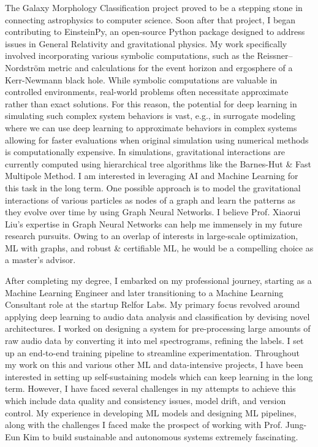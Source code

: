 \documentclass{article}
\begin{document}
  \vspace{5pt}
\hspace{0.25in}The Galaxy Morphology Classification project proved to be a stepping stone in
connecting astrophysics to computer science. Soon after that project, I began
contributing to EinsteinPy, an open-source Python package designed to address
issues in General Relativity and gravitational physics. My work specifically
involved incorporating various symbolic computations, such as the
Reissner–Nordström metric and calculations for the event horizon and ergosphere
of a Kerr-Newmann black hole. While symbolic computations are valuable in
controlled environments, real-world problems often necessitate approximate
rather than exact solutions. For this reason, the potential for deep learning in
simulating such complex system behaviors is vast, e.g., in surrogate modeling
where we can use deep learning to approximate behaviors in complex systems
allowing for faster evaluations when original simulation using numerical methods
is computationally expensive. In simulations, gravitational interactions are
currently computed using hierarchical tree algorithms like the Barnes-Hut \& Fast
Multipole Method. I am interested in leveraging AI and Machine Learning for this
task in the long term. One possible approach is to model the gravitational
interactions of various particles as nodes of a graph and learn the patterns as
they evolve over time by using Graph Neural Networks. I believe Prof. Xiaorui
Liu’s expertise in Graph Neural Networks can help me immensely in my future
research pursuits. Owing to an overlap of interests in large-scale optimization,
ML with graphs, and robust \& certifiable ML, he would be a compelling choice as a master’s advisor.

  \vspace{5pt}
\hspace{0.25in}After completing my degree, I embarked on my professional journey, starting as a
Machine Learning Engineer and later transitioning to a Machine Learning
Consultant role at the startup Relfor Labs. My primary focus revolved around
applying deep learning to audio data analysis and classification by devising
novel architectures. I worked on designing a system for pre-processing large
amounts of raw audio data by converting it into mel spectrograms, refining the
labels. I set up an end-to-end training pipeline to streamline experimentation.
Throughout my work on this and various other ML and data-intensive projects, I
have been interested in setting up self-sustaining models which can keep
learning in the long term. However, I have faced several challenges in my
attempts to achieve this which include data quality and consistency issues,
model drift, and version control. My experience in developing ML models and
designing ML pipelines, along with the challenges I faced make the prospect of
working with Prof. Jung-Eun Kim to build sustainable and autonomous systems
extremely fascinating.
\end{document}
